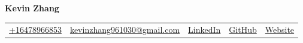 \documentclass{article}
\begin{document}
    \fontsize{10}{14.5}
    \selectfont
    \begin{center}
        \begin{center}
            \huge\bfseries Kevin Zhang
        \end{center}
            \begin{tabular}{c|c|c|c|c}
                \href{tel:+16478966853}{+16478966853} &
                \href{mailto:kevinzhang961030@gmail.com}{kevinzhang961030@gmail.com} & 
                \href{https://www.linkedin.com/in/kevin-zhang-uoft/}{LinkedIn} & 
                \href{https://github.com/diebrate/}{GitHub} &
                \href{https://diebrate.github.io/}{Website}
        \end{tabular}
    \end{center}    
    \vspace{-0.75em}
    
    
    
    
    
  
\end{document}
